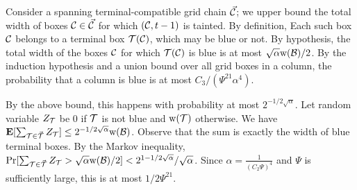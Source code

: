 \documentclass{acmsmall}
\newcommand{\cB}{{\cal B}}
\newcommand{\cC}{{\cal C}}
\newcommand{\cT}{{\cal T}}
\newcommand{\gridprecval}{\frac{1}{(C_2\errorcont)^4}}
\newcommand{\suff}{{21}}
\newcommand{\EX}{\hbox{\bf E}}
\newcommand{\width}{{\bf {\rm  w}}}
\newcommand{\gridprec}{\alpha}
\newcommand{\errorcont}{\Psi}
\begin{document}
\iffalse
 Consider a spanning terminal-compatible grid chain $\vec{\cC}$; we upper
bound the total width of boxes $\cC \in \vec{\cC}$ for which $(\cC,t-1)$ is tainted. By definition,  Each such  box $\cC$ 
belongs to a terminal box $\cT(\cC)$, which may be blue or not. By hypothesis, the total width of the boxes $\cC$ for which
$\cT(\cC)$ is blue is at most $\sqrt{\alpha} \width(\cB)/2$.  
By the induction hypothesis and 
a union bound over all grid boxes in a column, the probability that a column is blue is at most $C_3/(\errorcont^{\suff}\gridprec^4)$.

 By the above bound, this happens with probability at most $2^{-1/2\sqrt{\gridprec}}$.
Let random variable $Z_\cT$ be $0$ if $\cT$ is not blue and $\width(\cT)$ otherwise.
We have $\EX[\sum_{\cT \in \vec{\cT}} Z_\cT] \leq 2^{-1/2\sqrt{\gridprec}} \width(\cB)$. 
Observe that the sum is exactly the width of blue terminal boxes. By the Markov inequality,
$\Pr[\sum_{\cT \in \vec{\cT}} Z_\cT > \sqrt{\gridprec}\width(\cB)/2] < 2^{1-1/2\sqrt{\gridprec}}/\sqrt{\gridprec}$.
Since $\gridprec = \gridprecval$ and $\errorcont$ is sufficiently large, this is at most $1/2\errorcont^{\suff}$.
\end{document}
